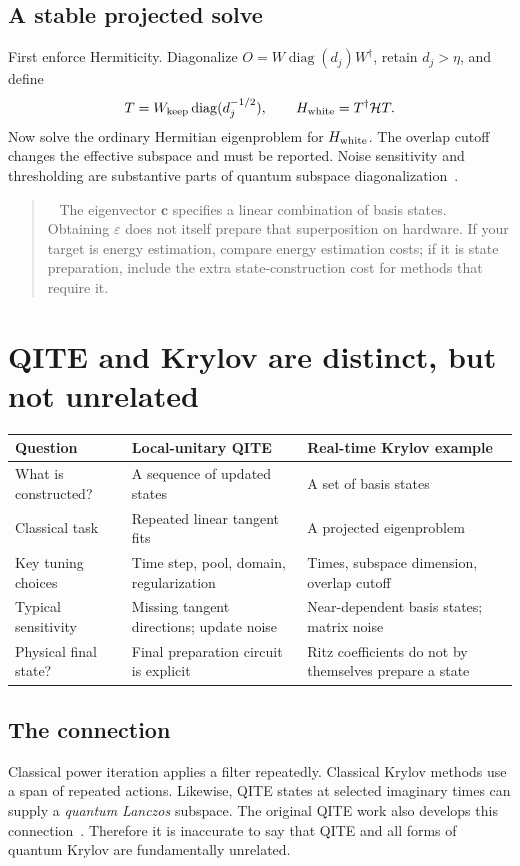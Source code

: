 \documentclass[11pt,a4paper]{article}
\newcommand{\lesson}[2]{\clearpage\section{#1}\label{#2}}
\newenvironment{caution}[1][Important distinction]{\par\smallskip\begin{quotation}\noindent{\bfseries\textcolor{alertred}{#1.}}\ }{\end{quotation}\smallskip}
\begin{document}
\subsection*{A stable projected solve}
First enforce Hermiticity. Diagonalize $O=W\operatorname{diag}(d_j)W^\dagger$, retain $d_j>\eta$, and define
\[
T=W_{\rm keep}\operatorname{diag}(d_j^{-1/2}),\qquad
H_{\rm white}=T^\dagger\mathcal H T.
\]
Now solve the ordinary Hermitian eigenproblem for $H_{\rm white}$. The overlap cutoff changes the effective subspace and must be reported. Noise sensitivity and thresholding are substantive parts of quantum subspace diagonalization~\cite{epperly}.

\begin{caution}[An energy estimate is not automatically a prepared state]
The eigenvector $\bm c$ specifies a linear combination of basis states. Obtaining $\varepsilon$ does not itself prepare that superposition on hardware. If your target is energy estimation, compare energy estimation costs; if it is state preparation, include the extra state-construction cost for methods that require it.
\end{caution}

\lesson{QITE and Krylov are distinct, but not unrelated}{sec:comparison}
\begin{tabularx}{\linewidth}{@{}p{3.0cm}X X@{}}
\toprule
Question & Local-unitary QITE & Real-time Krylov example\\\midrule
What is constructed? & A sequence of updated states & A set of basis states\\
Classical task & Repeated linear tangent fits & A projected eigenproblem\\
Key tuning choices & Time step, pool, domain, regularization & Times, subspace dimension, overlap cutoff\\
Typical sensitivity & Missing tangent directions; update noise & Near-dependent basis states; matrix noise\\
Physical final state? & Final preparation circuit is explicit & Ritz coefficients do not by themselves prepare a state\\\bottomrule
\end{tabularx}

\subsection*{The connection}
Classical power iteration applies a filter repeatedly. Classical Krylov methods use a span of repeated actions. Likewise, QITE states at selected imaginary times can supply a \emph{quantum Lanczos} subspace. The original QITE work also develops this connection~\cite{motta}. Therefore it is inaccurate to say that QITE and all forms of quantum Krylov are fundamentally unrelated.
\end{document}
